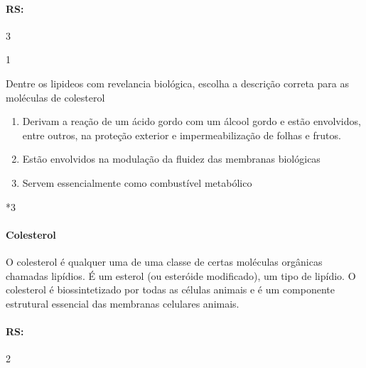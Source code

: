 \documentclass[\mainfilename]{subfiles}
\begin{document}
\begin{questionBox}
\begin{questionBox}
    \end{questionBox}

    \paragraph{RS:} 3
    
\end{questionBox}

\begin{questionBox}1{}
    
    Dentre os lipideos com revelancia biológica, escolha a descrição correta para as moléculas de colesterol

    \begin{enumerate}
        \item Derivam a reação de um ácido gordo com um álcool gordo e estão envolvidos, entre outros, na proteção exterior e impermeabilização de folhas e frutos.
        \item Estão envolvidos na modulação da fluidez das membranas biológicas
        \item Servem essencialmente como combustível metabólico
    \end{enumerate}

    \vspace{-5ex}

    \begin{questionBox}*3{}
        
        \paragraph{Colesterol}
        O colesterol é qualquer uma de uma classe de certas moléculas orgânicas chamadas lipídios. É um esterol (ou esteróide modificado), um tipo de lipídio. O colesterol é biossintetizado por todas as células animais e é um componente estrutural essencial das membranas celulares animais.
        
    \end{questionBox}

    \paragraph{RS:}2
    
\end{questionBox}
\end{document}
